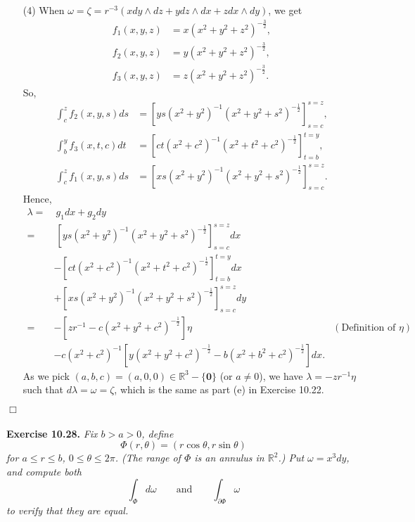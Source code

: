 \documentclass{article}
\begin{document}
\begin{enumerate}
\item[(4)]
  When $\omega = \zeta = r^{-3} (x dy \wedge dz + y dz \wedge dx + z dx \wedge dy)$,
  we get
  \begin{align*}
    f_1(x,y,z) &= x (x^2+y^2+z^2)^{-\frac{3}{2}}, \\
    f_2(x,y,z) &= y (x^2+y^2+z^2)^{-\frac{3}{2}}, \\
    f_3(x,y,z) &= z (x^2+y^2+z^2)^{-\frac{3}{2}}.
  \end{align*}
  So,
  \begin{align*}
    \int_{c}^{z} f_2(x,y,s) ds
    &= \left[ ys (x^2+y^2)^{-1}(x^2+y^2+s^2)^{-\frac{1}{2}} \right]_{s=c}^{s=z}, \\
    \int_{b}^{y} f_3(x,t,c) dt
    &= \left[ ct (x^2+c^2)^{-1}(x^2+t^2+c^2)^{-\frac{1}{2}} \right]_{t=b}^{t=y}, \\
    \int_{c}^{z} f_1(x,y,s) ds
    &= \left[ xs (x^2+y^2)^{-1}(x^2+y^2+s^2)^{-\frac{1}{2}} \right]_{s=c}^{s=z}.
  \end{align*}
  Hence,
  \begin{align*}
    \lambda
    =& \: g_1 dx + g_2 dy \\
    =& \: \left[ ys (x^2+y^2)^{-1}(x^2+y^2+s^2)^{-\frac{1}{2}} \right]_{s=c}^{s=z} dx \\
      &- \left[ ct (x^2+c^2)^{-1}(x^2+t^2+c^2)^{-\frac{1}{2}} \right]_{t=b}^{t=y} dx \\
      &+ \left[ xs (x^2+y^2)^{-1}(x^2+y^2+s^2)^{-\frac{1}{2}} \right]_{s=c}^{s=z} dy \\
    =& - \left[ zr^{-1} - c(x^2+y^2+c^2)^{-\frac{1}{2}} \right] \eta
      &(\text{Definition of $\eta$}) \\
      &- c(x^2+c^2)^{-1} \left[ y(x^2+y^2+c^2)^{-\frac{1}{2}}
        - b(x^2+b^2+c^2)^{-\frac{1}{2}} \right] dx.
  \end{align*}
  As we pick $(a,b,c) = (a,0,0) \in \mathbb{R}^3 - \{ \mathbf{0} \}$ (or $a \neq 0$),
  we have $\lambda = -zr^{-1} \eta$ such that $d\lambda = \omega = \zeta$,
  which is the same as part (e) in Exercise 10.22.
\end{enumerate}
$\Box$ \\\\






\textbf{Exercise 10.28.}
\emph{Fix $b > a > 0$, define
\[
  \Phi(r,\theta) = (r\cos\theta, r\sin\theta)
\]
for $a \leq r \leq b$, $0 \leq \theta \leq 2\pi$.
(The range of $\Phi$ is an annulus in $\mathbb{R}^2$.)
Put $\omega = x^3 dy$,
and compute both
\[
  \int_{\Phi} d\omega
  \qquad
  \text{and}
  \qquad
  \int_{\partial\Phi} \omega
\]
to verify that they are equal.} \\
\end{document}
